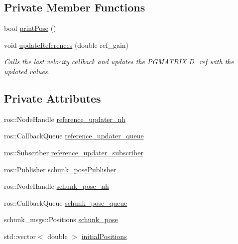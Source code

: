\subsection*{Private Member Functions}
\begin{DoxyCompactItemize}
\item 
bool \hyperlink{classCartesian__pose__controller_ab55ab40074c82ba8cc010fe68fc76d5b}{print\-Pose} ()
\item 
void \hyperlink{classCartesian__pose__controller_a965f86a383eb205df10832626fac98af}{update\-References} (double ref\-\_\-gain)
\begin{DoxyCompactList}\small\item\em Calls the last velocity callback and updates the P\-G\-M\-A\-T\-R\-I\-X D\-\_\-ref with the updated values. \end{DoxyCompactList}\end{DoxyCompactItemize}
\subsection*{Private Attributes}
\begin{DoxyCompactItemize}
\item 
ros\-::\-Node\-Handle \hyperlink{classCartesian__pose__controller_ab2d5fe68c8229b6c90f84ac1601eb637}{reference\-\_\-updater\-\_\-nh}
\item 
ros\-::\-Callback\-Queue \hyperlink{classCartesian__pose__controller_a6eea82d82ccd6c925be31c18e1b4a432}{reference\-\_\-updater\-\_\-queue}
\item 
ros\-::\-Subscriber \hyperlink{classCartesian__pose__controller_a9394ae99649279f815c234b1ca7801b6}{reference\-\_\-updater\-\_\-subscriber}
\item 
ros\-::\-Publisher \hyperlink{classCartesian__pose__controller_a9eb38e771e5006950b9a8075a0ea7e49}{schunk\-\_\-pose\-Publisher}
\item 
ros\-::\-Node\-Handle \hyperlink{classCartesian__pose__controller_a41a692189fed59ec8ec8460539f63c66}{schunk\-\_\-pose\-\_\-nh}
\item 
ros\-::\-Callback\-Queue \hyperlink{classCartesian__pose__controller_a5efe52a57e5239b3fd86ff456e94691b}{schunk\-\_\-pose\-\_\-queue}
\item 
schunk\-\_\-msgs\-::\-Positions \hyperlink{classCartesian__pose__controller_a301bc44e901e4837cf036661478354c4}{schunk\-\_\-pose}
\item 
std\-::vector$<$ double $>$ \hyperlink{classCartesian__pose__controller_a42433d7f2e4e03ccaac56e1f9a7a5027}{initial\-Positions}
\end{DoxyCompactItemize}
